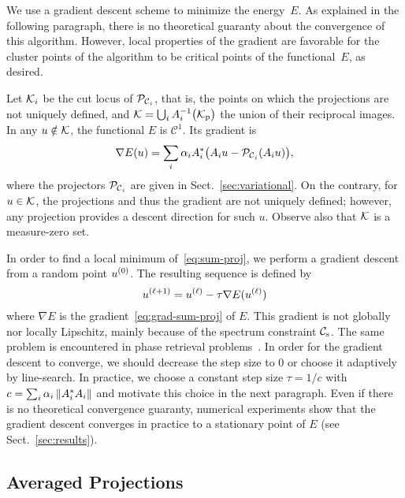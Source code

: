 We use a gradient descent scheme to minimize the energy~$E$.
As explained in the following paragraph, there is no theoretical guaranty about the convergence of this algorithm.
However, local properties of the gradient are favorable for the cluster points of the algorithm to be critical points of the functional~$E$, as desired.

Let $\mathcal{K}_i$ be the cut locus of $\mathcal{P}_{{{\mathcal{C}_{\mathrm{}}}}_i}$, that is, the points on which the projections are not uniquely defined, and $\mathcal{K} = \bigcup_i A_i^{-1}\big(\mathcal{K}_\text{p}\big) $ the union of their reciprocal images.
In any $u\notin\mathcal{K}$, the functional $E$ is $\mathcal{C}^1$.
Its gradient is
\begin{equation}
  \label{eq:grad-sum-proj}
  \nabla E(u) = \sum_i \alpha_i A_i^* \big(A_i u - \mathcal{P}_{{{\mathcal{C}_{\mathrm{}}}}_i}(A_i u)\big),
\end{equation}
where the projectors $\mathcal{P}_{{{\mathcal{C}_{\mathrm{}}}}_i}$ are given in Sect.~\ref{sec:variational}.
On the contrary, for $u\in\mathcal{K}$, the projections and thus the gradient are not uniquely defined; however, any projection provides a descent direction for such $u$.
Observe also that $\mathcal{K}$ is a measure-zero set.

In order to find a local minimum of~\eqref{eq:sum-proj}, we perform a gradient descent from a random point $u^{(0)}$.
The resulting sequence is defined by
\begin{equation}
  \label{eq:grad-descent}
  u^{\left(\ell+1\right)} = u^{\left(\ell\right)} - \tau \nabla E(u^{\left(\ell\right)})
\end{equation}
where $\nabla E$ is the gradient~\eqref{eq:grad-sum-proj} of $E$.
This gradient is not globally nor locally Lipschitz, mainly because of the spectrum constraint ${\mathcal{C}_{\mathrm{s}}}$.
The same problem is encountered in phase retrieval problems~\cite{bauschke2002phase}.
In order for the gradient descent to converge, we should decrease the step size to $0$ or choose it adaptively by line-search.
In practice, we choose a constant step size $\tau = 1/c$ with $c = \sum_i \alpha_i \left\|A_i^* A_i\right\|$ and motivate this choice in the next paragraph.
Even if there is no theoretical convergence guaranty, numerical experiments show that the gradient descent converges in practice to a stationary point of $E$ (see Sect.~\ref{sec:results}).


\subsection{Averaged Projections}
\label{sub:avg-projections}

